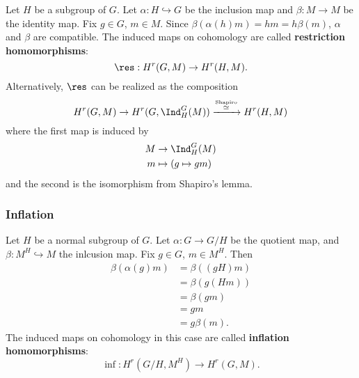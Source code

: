 Let $H$ be a subgroup of $G$. Let $\alpha:H\hookrightarrow G$ be the inclusion map and $\beta:M\to M$ be the identity map. Fix $g\in G$, $m\in M$. Since $\beta(\alpha(h)m)=hm=h\beta(m)$, $\alpha$ and $\beta$ are compatible. The induced maps on cohomology are called \textbf{restriction homomorphisms}:
\[
	\res:H^{r}(G,M)\to H^{r}(H,M)
.\] 
Alternatively, $\res$ can be realized as the composition
\[
	H^{r}(G,M)\to H^{r}(G,\Ind^{G}_H(M))\xrightarrow{\overset{\text{Shapiro}}{\simeq}} H^{r}(H,M)
\] 
where the first map is induced by  
\begin{align*}
	M&\to\Ind^{G}_H(M)\\
	m&\mapsto (g\mapsto gm)
\end{align*}
and the second is the isomorphism from Shapiro's lemma.
\subsubsection{Inflation}
Let $H$ be a normal subgroup of $G$. Let $\alpha:G\to G/H$ be the quotient map, and $\beta:M^{H}\hookrightarrow M$ the inlcusion map. Fix $g\in G$, $m\in M^{H}$. Then 
\begin{align*}
	\beta(\alpha(g)m)&=\beta((gH)m)\\
			 &=\beta(g(Hm))\\
			 &=\beta(gm)\\
			 &=gm\\
			 &=g\beta(m)
.\end{align*}
The induced maps on cohomology in this case are called \textbf{inflation homomorphisms}:
\[
	\inf:H^{r}(G/H,M^{H})\to H^{r}(G,M)
.\] 
